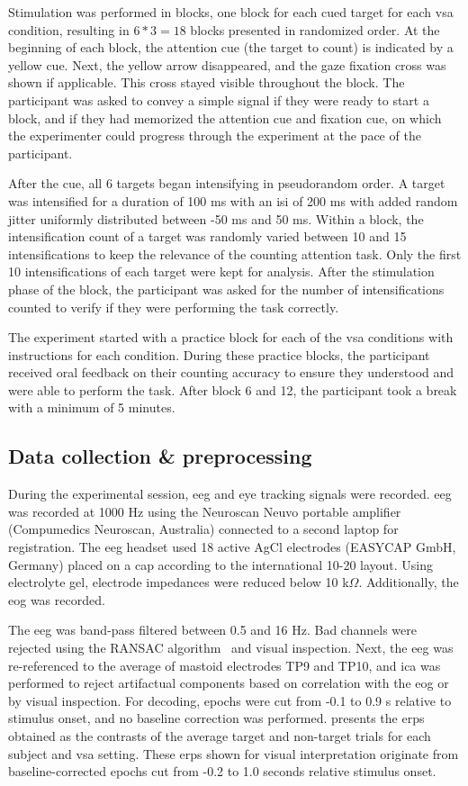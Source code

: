 \documentclass{article}
\begin{document}
Stimulation was performed in blocks, one block for each cued target for each
\ac{vsa} condition, resulting in $6*3=18$ blocks presented in randomized order.
At the beginning of each block, the attention cue (the target to count) is
indicated by a yellow cue.
Next, the yellow arrow disappeared, and the gaze fixation cross was shown if applicable.
This cross stayed visible throughout the block.
The participant was asked to convey a simple signal if they were ready to start a
block, and if they had memorized the attention cue and fixation cue, on which the
experimenter could progress through the experiment at the pace of the participant.

After the cue, all 6 targets began intensifying in pseudorandom order.
A target was intensified for a duration of 100 ms with an \ac{isi} of 200 ms
with added random jitter uniformly distributed between -50 ms and 50 ms.
Within a block, the intensification count of a target was randomly varied between
10 and 15 intensifications to keep the relevance of the counting attention task.
Only the first 10 intensifications of each target were kept for analysis.
After the stimulation phase of the block, the participant was asked for the number
of intensifications counted to verify if they were performing the task correctly.

The experiment started with a practice block for each of the \ac{vsa} conditions
with instructions for each condition.
During these practice blocks, the participant received oral feedback on their counting
accuracy to ensure they understood and were able to perform the task.
After block 6 and 12, the participant took a break with a minimum of 5 minutes.


\subsection{Data collection \& preprocessing}
\label{sec:methods/data-collection}

During the experimental session, \ac{eeg} and eye tracking signals were recorded.
\Ac{eeg} was recorded at 1000 Hz using the Neuroscan Neuvo portable amplifier (Compumedics Neuroscan,
Australia) connected to a second laptop for registration.
The \ac{eeg} headset used 18 active AgCl electrodes (EASYCAP GmbH, Germany) placed on a cap
according to the international 10-20 layout.
Using electrolyte gel, electrode impedances were reduced below 10 k$\Omega$.
Additionally, the \ac{eog} was recorded.

The \ac{eeg} was band-pass filtered between 0.5 and 16 Hz.
Bad channels were rejected using the RANSAC algorithm~\cite{Fischler1981}
and visual inspection.
Next, the \ac{eeg} was re-referenced to the average of mastoid electrodes TP9
and TP10, and \ac{ica} was performed to reject artifactual components based on
correlation with the \ac{eog} or by visual inspection.
For decoding, epochs were cut from -0.1 to 0.9 s relative to stimulus onset, and no baseline
correction was performed.
 presents the \acp{erp} obtained as the contrasts
of the average target and non-target trials for each subject and \ac{vsa}
setting.
These \acp{erp} shown for visual interpretation originate from baseline-corrected
epochs cut from -0.2 to 1.0 seconds relative stimulus onset.
\end{document}
